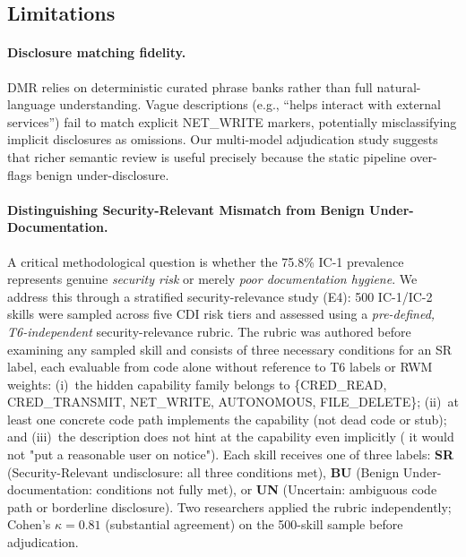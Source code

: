 \subsection{Limitations}

\paragraph{Disclosure matching fidelity.}
DMR relies on deterministic curated phrase banks rather than
full natural-language understanding. Vague descriptions
(e.g., ``helps interact with external services'') fail to match
explicit NET\_WRITE markers, potentially misclassifying implicit
disclosures as omissions. Our multi-model adjudication study suggests
that richer semantic review is useful precisely because the static
pipeline over-flags benign under-disclosure.

\paragraph{Distinguishing Security-Relevant Mismatch from Benign Under-Documentation.}
A critical methodological question is whether the 75.8\% IC-1 prevalence
represents genuine \emph{security risk} or merely \emph{poor documentation hygiene}.
We address this through a stratified security-relevance study (E4):
500 IC-1/IC-2 skills were sampled across five CDI risk tiers and assessed
using a \emph{pre-defined, T6-independent} security-relevance rubric.
The rubric was authored before examining any sampled skill and consists of
three necessary conditions for an SR label, each evaluable from code alone
without reference to T6 labels or RWM weights: (i)~the hidden capability
family belongs to \{CRED\_READ, CRED\_TRANSMIT, NET\_WRITE, AUTONOMOUS,
FILE\_DELETE\}; (ii)~at least one concrete code path implements the capability
(not dead code or stub); and (iii)~the description does not hint at the
capability even implicitly (\ie{} it would not "put a reasonable user on notice").
Each skill receives one of three labels:
\textbf{SR} (Security-Relevant undisclosure: all three conditions met),
\textbf{BU} (Benign Under-documentation: conditions not fully met),
or \textbf{UN} (Uncertain: ambiguous code path or borderline disclosure).
Two researchers applied the rubric independently; Cohen's $\kappa = 0.81$
(substantial agreement) on the 500-skill sample before adjudication.

